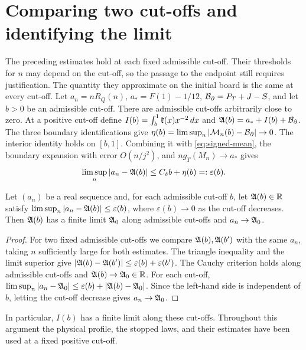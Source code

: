 \section{Comparing two cut-offs and identifying the limit}\label{app:closing}
The preceding estimates hold at each fixed admissible cut-off. Their thresholds for \(n\) may depend on
the cut-off, so the passage to the endpoint still requires justification. The quantity they approximate
on the initial board is the same at every cut-off. Let \(a_n=nR_Q(n)\), \(a_*=F(1)-1/12\),
\(\mathcal B_{\partial}=P_T+J-S\), and let \(b>0\) be an admissible cut-off. There are admissible cut-offs
arbitrarily close to zero. At a positive cut-off define \(I(b)=\int_b^1 \mathfrak{k}(x)x^{-2}\,dx\) and
\(\mathfrak A(b)=a_*+I(b)+\mathcal B_{\partial}\). The three boundary identifications give
\(\eta(b)=\limsup_n|\mathcal M_n(b)-\mathcal B_{\partial}|\to0\). The interior identity holds on \([b,1]\).
Combining it with \eqref{eq:signed-mean}, the boundary expansion with error \(O(n/j^2)\), and \(n
g_T(M_n)\to a_*\) gives
\[
 \limsup_n|a_n-\mathfrak A(b)|\le C_\delta b+\eta(b)=:\varepsilon(b).
\]
\begin{lema}\label{lem:dos-cortes}
Let \((a_n)\) be a real sequence and, for each admissible cut-off \(b\), let \(\mathfrak A(b)\in\mathbb
R\) satisfy \(\limsup_n|a_n-\mathfrak A(b)|\le\varepsilon(b)\), where \(\varepsilon(b)\to0\) as the
cut-off decreases. Then \(\mathfrak A(b)\) has a finite limit \(\mathfrak A_0\) along admissible cut-offs
and \(a_n\to\mathfrak A_0\).
\end{lema}
\begin{proof}
For two fixed admissible cut-offs we compare \(\mathfrak A(b),\mathfrak A(b')\) with the same \(a_n\),
taking \(n\) sufficiently large for both estimates. The triangle inequality and the limit superior give
\(|\mathfrak A(b)-\mathfrak A(b')|\le\varepsilon(b)+\varepsilon(b')\). The Cauchy criterion holds along
admissible cut-offs and \(\mathfrak A(b)\to\mathfrak A_0\in\mathbb R\). For each cut-off,
\(\limsup_n|a_n-\mathfrak A_0|\le\varepsilon(b)+|\mathfrak A(b)-\mathfrak A_0|\). Since the left-hand
side is independent of \(b\), letting the cut-off decrease gives \(a_n\to\mathfrak A_0\).
\end{proof}
In particular, \(I(b)\) has a finite limit along these cut-offs. Throughout this argument the physical
profile, the stopped laws, and their estimates have been used at a fixed positive cut-off.



